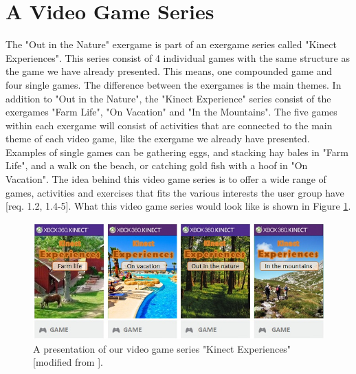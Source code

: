 \section{A Video Game Series}
The "Out in the Nature" exergame is part of an exergame series called "Kinect Experiences". This series consist of 4 individual games with the same structure as the game we have already presented. This means, one compounded game and four single games. The difference between the exergames is the main themes. In addition to "Out in the Nature", the "Kinect Experience" series consist of the exergames "Farm Life", "On Vacation" and "In the Mountains". The five games within each exergame will consist of activities that are connected to the main theme of each video game, like the exergame we already have presented. Examples of single games can be gathering eggs, and stacking hay bales in "Farm Life", and a walk on the beach, or catching gold fish with a hoof in "On Vacation". The idea behind this video game series is to offer a wide range of games, activities and exercises that fits the various interests the user group have [req. 1.2, 1.4-5]. What this video game series would look like is shown in Figure \ref{fig:videogameseriesAlone}. 

\begin{figure} [H]
\centering
\includegraphics[scale=0.65]{videoGameSeriesAlone.jpg}
\caption[Presentation of our video game series]{A presentation of our video game series "Kinect Experiences" [modified from \cite{XboxNettside}].}
\label{fig:videogameseriesAlone}
\end{figure}

